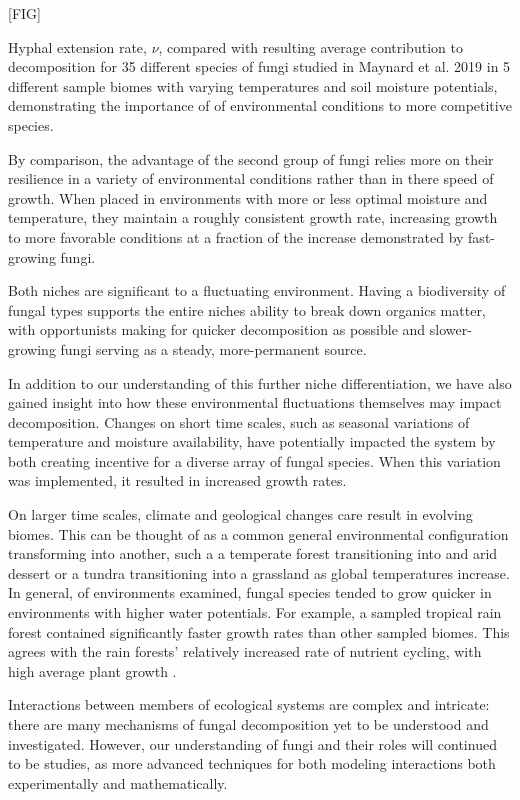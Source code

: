 \documentclass{article}
\begin{document}
[FIG]
\caption{Hyphal extension rate, $\nu$, compared with resulting average contribution to decomposition for 35 different species of fungi studied in Maynard et al. 2019 in 5 different sample biomes with varying temperatures and soil moisture potentials, demonstrating the importance of of environmental conditions to more competitive species.}

By comparison, the advantage of the second group of fungi relies more on their resilience in a variety of environmental conditions rather than in there speed of growth. When placed in environments with more or less optimal moisture and temperature, they maintain a roughly consistent growth rate, increasing growth to more favorable conditions at a fraction of the increase demonstrated by fast-growing fungi.

Both niches are significant to a fluctuating environment. Having a biodiversity of fungal types supports the entire niches ability to break down organics matter, with opportunists making for quicker decomposition as possible and slower-growing fungi serving as a steady, more-permanent  source.

In addition to our understanding of this further niche differentiation, we have also gained insight into how these environmental fluctuations themselves may impact decomposition. Changes on short time scales, such as seasonal variations of temperature and moisture availability, have potentially impacted the system by both creating incentive for a diverse array of fungal species. When this variation was implemented, it resulted in increased growth rates.

On larger time scales, climate and geological changes care result in evolving biomes. This can be thought of as a common general environmental configuration transforming into another, such a a temperate forest transitioning into and arid dessert or a tundra transitioning into a grassland as global temperatures increase. In general, of environments examined, fungal species tended to grow quicker in environments with higher water potentials. For example, a sampled tropical rain forest contained significantly faster growth rates than other sampled biomes. This agrees with the rain forests' relatively increased rate of nutrient cycling, with high average plant growth \cite{Lodge1993}.

Interactions between members of ecological systems are complex and intricate: there are many mechanisms of fungal decomposition yet to be understood and investigated. However, our understanding of fungi and their roles will continued to be studies, as more advanced techniques for both modeling interactions both experimentally and mathematically.
\end{document}
